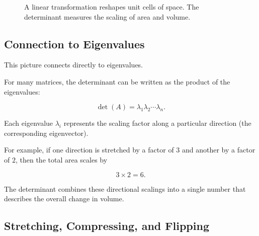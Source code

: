 \documentclass[11pt,openany]{book}
\theoremstyle{definition}
\begin{document}
\begin{figure}[htbp]
\begin{minipage}{0.45\textwidth}

\caption*{In $\mathbb{R}^3$, the determinant measures how the volume of the unit cube changes under the transformation.}
\end{minipage}

\caption{A linear transformation reshapes unit cells of space. The determinant measures the scaling of area and volume.}
\label{fig:determinant_geometry}

\end{figure}

\medskip

\subsection{Connection to Eigenvalues}

This picture connects directly to eigenvalues.

\medskip

For many matrices, the determinant can be written as the product of the eigenvalues:

\[
\det(A) = \lambda_1 \lambda_2 \cdots \lambda_n.
\]

\medskip

Each eigenvalue $\lambda_i$ represents the scaling factor along a particular direction 
(the corresponding eigenvector).

\medskip

For example, if one direction is stretched by a factor of $3$ and another by a factor of $2$, 
then the total area scales by

\[
3 \times 2 = 6.
\]

\medskip

The determinant combines these directional scalings into a single number that describes 
the overall change in volume.

\medskip

\subsection{Stretching, Compressing, and Flipping}
\end{document}

